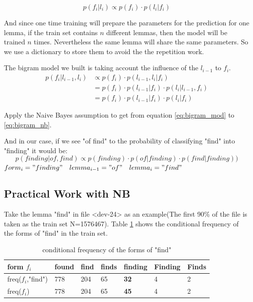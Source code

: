 \documentclass[a4paper]{article}
\begin{document}
\[p(f_i|l_i) \propto p(f_i) \cdot  p(l_i|f_i)\]


And since one time training will prepare the parameters for the prediction for one lemma, if the train set contains $n$ different lemmas, then the model will be trained $n$ times. Nevertheless the same lemma will share the same parameters. So we use a dictionary to store them to avoid the the repetition work.


The bigram model we built is taking account the influence of the $l_{i-1}$ to $f_i$.
\begin{align}
p(f_i|l_{i-1},l_i) &\propto p(f_i) \cdot  p(l_{i-1},l_i|f_i)  \\
&= p(f_i) \cdot  p(l_{i-1}|f_i) \cdot p( l_i | l_{i-1},f_i) \label{eq:bigram_mod} \\
&= p(f_i) \cdot  p(l_{i-1}|f_i) \cdot p( l_i | f_i) \label{eq:bigram_nb}
\end{align}

Apply the Naive Bayes assumption to get from equation \ref{eq:bigram_mod} to \ref{eq:bigram_nb}. 

And in our case, if we see "of find" to the probability of classifying "find" into "finding"   it would be:
\begin{equation} \label{eq:bigram_find}
p(finding | of,find) \propto p(finding)\cdot p(of | finding) \cdot  p(find | finding)) 
\end{equation}
$form_i="finding" \quad lemma_{i-1}="of" \quad lemma_i="find"$ 


\subsection{Practical Work with NB}

Take the lemma "find" in file <dev-24> as an example(The first 90\% of the file is taken as the train set N=1576467). Table \ref{tb:cfd_find} shows the conditional frequency of the forms of "find" in the train set. 

\begin{table}[htb]
\centering
\begin{tabular}{|l|llllll|}
\hline
form $f_i$       & found & find & finds & finding & Finding & Finds \\ \hline
freq($f_i$,"find") & 778   & 204  & 65    & \textbf{32}      & 4       & 2     \\ \hline
freq($f_i$) & 778   & 204  & 65    & \textbf{45}      & 4       & 2     \\ \hline
\end{tabular}
\caption{conditional frequency of the forms of "find"}
\label{tb:cfd_find}
\end{table}
\end{document}
